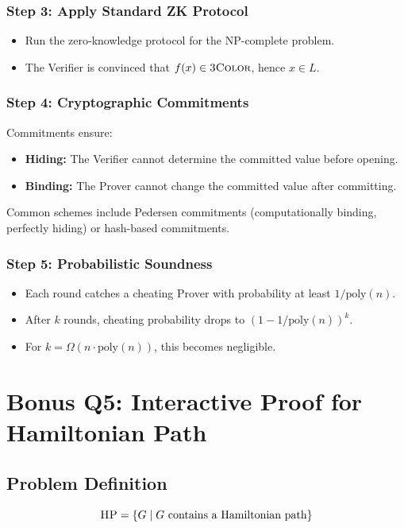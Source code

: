 \documentclass[11pt]{article}
\begin{document}
\subsubsection{Step 3: Apply Standard ZK Protocol}
\begin{itemize}
    \item Run the zero-knowledge protocol for the NP-complete problem.
    \item The Verifier is convinced that $f(x) \in \textsc{3Color}$, hence $x \in L$.
\end{itemize}

\subsubsection{Step 4: Cryptographic Commitments}
Commitments ensure:
\begin{itemize}
    \item \textbf{Hiding:} The Verifier cannot determine the committed value before opening.
    \item \textbf{Binding:} The Prover cannot change the committed value after committing.
\end{itemize}

Common schemes include Pedersen commitments (computationally binding, perfectly hiding) or hash-based commitments.

\subsubsection{Step 5: Probabilistic Soundness}
\begin{itemize}
    \item Each round catches a cheating Prover with probability at least $1/\text{poly}(n)$.
    \item After $k$ rounds, cheating probability drops to $(1 - 1/\text{poly}(n))^k$.
    \item For $k = \Omega(n \cdot \text{poly}(n))$, this becomes negligible.
\end{itemize}

\section{Bonus Q5: Interactive Proof for Hamiltonian Path}

\subsection{Problem Definition}
\[
\textsc{HP} = \{ G \mid G \text{ contains a Hamiltonian path} \}
\]
\end{document}

